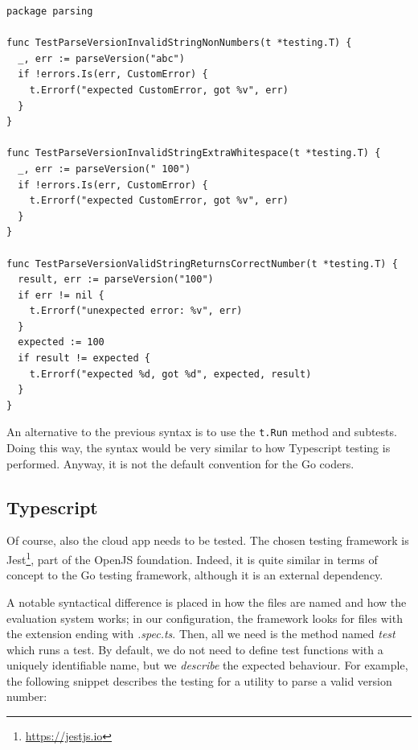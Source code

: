 \noindent\begin{minipage}{\linewidth}
  \vspace{0.5cm}
  \begin{lstlisting}[language=Golang, caption={Go testing framework example file parsing\_test.go}]
package parsing

func TestParseVersionInvalidStringNonNumbers(t *testing.T) {
  _, err := parseVersion("abc")
  if !errors.Is(err, CustomError) {
    t.Errorf("expected CustomError, got %v", err)
  }
}

func TestParseVersionInvalidStringExtraWhitespace(t *testing.T) {
  _, err := parseVersion(" 100")
  if !errors.Is(err, CustomError) {
    t.Errorf("expected CustomError, got %v", err)
  }
}

func TestParseVersionValidStringReturnsCorrectNumber(t *testing.T) {
  result, err := parseVersion("100")
  if err != nil {
    t.Errorf("unexpected error: %v", err)
  }
  expected := 100
  if result != expected {
    t.Errorf("expected %d, got %d", expected, result)
  }
}
\end{lstlisting}
\end{minipage}

An alternative to the previous syntax is to use the \texttt{t.Run} method and subtests. Doing this way, the syntax would be very similar to how Typescript testing is performed. Anyway, it is not the default convention for the Go coders.

\subsection{Typescript}

Of course, also the cloud app needs to be tested. The chosen testing framework is Jest\footnote{\url{https://jestjs.io}}, part of the OpenJS foundation. Indeed, it is quite similar in terms of concept to the Go testing framework, although it is an external dependency.

A notable syntactical difference is placed in how the files are named and how the evaluation system works; in our configuration, the framework looks for files with the extension ending with \textit{.spec.ts}. Then, all we need is the method named \textit{test} which runs a test. By default, we do not need to define test functions with a uniquely identifiable name, but we \textit{describe} the expected behaviour. For example, the following snippet describes the testing for a utility to parse a valid version number:

